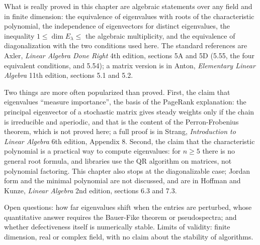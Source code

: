 \begin{untukpeneliti}
What is really proved in this chapter are algebraic statements over any field and in finite
dimension: the equivalence of eigenvalues with roots of the characteristic polynomial, the
independence of eigenvectors for distinct eigenvalues, the inequality
$1\le\dim E_{\lambda}\le$ the algebraic multiplicity, and the equivalence of diagonalization with
the two conditions used here. The standard references are Axler, \emph{Linear Algebra Done Right}
4th edition, sections 5A and 5D (5.55, the four equivalent conditions, and 5.54); a matrix version
is in Anton, \emph{Elementary Linear Algebra} 11th edition, sections 5.1 and 5.2.

Two things are more often popularized than proved. First, the claim that eigenvalues ``measure
importance'', the basis of the PageRank explanation: the principal eigenvector of a stochastic
matrix gives steady weights only if the chain is irreducible and aperiodic, and that is the content
of the Perron-Frobenius theorem, which is not proved here; a full proof is in Strang,
\emph{Introduction to Linear Algebra} 6th edition, Appendix 8. Second, the claim that the
characteristic polynomial is a practical way to compute eigenvalues: for $n\ge5$ there is no
general root formula, and libraries use the QR algorithm on matrices, not polynomial factoring.
This chapter also stops at the diagonalizable case; Jordan form and the minimal polynomial are not
discussed, and are in Hoffman and Kunze, \emph{Linear Algebra} 2nd edition, sections 6.3 and 7.3.

Open questions: how far eigenvalues shift when the entries are perturbed, whose quantitative answer
requires the Bauer-Fike theorem or pseudospectra; and whether defectiveness itself is numerically
stable. Limits of validity: finite dimension, real or complex field, with no claim about the
stability of algorithms.
\end{untukpeneliti}

